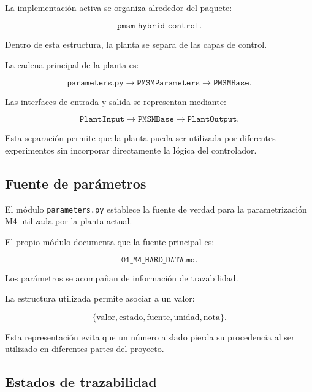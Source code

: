 La implementación activa se organiza alrededor del paquete:

\begin{equation}
\texttt{pmsm\_hybrid\_control}.
\end{equation}

Dentro de esta estructura, la planta se separa de las capas de control.

La cadena principal de la planta es:

\begin{equation}
\texttt{parameters.py}
\rightarrow
\texttt{PMSMParameters}
\rightarrow
\texttt{PMSMBase}.
\end{equation}

Las interfaces de entrada y salida se representan mediante:

\begin{equation}
\texttt{PlantInput}
\rightarrow
\texttt{PMSMBase}
\rightarrow
\texttt{PlantOutput}.
\end{equation}

Esta separación permite que la planta pueda ser utilizada por diferentes experimentos sin incorporar directamente la lógica del controlador.

\subsection{Fuente de parámetros}

El módulo \texttt{parameters.py} establece la fuente de verdad para la parametrización M4 utilizada por la planta actual.

El propio módulo documenta que la fuente principal es:

\begin{equation}
\texttt{01\_M4\_HARD\_DATA.md}.
\end{equation}

Los parámetros se acompañan de información de trazabilidad.

La estructura utilizada permite asociar a un valor:

\begin{equation}
\{
\text{valor},
\text{estado},
\text{fuente},
\text{unidad},
\text{nota}
\}.
\end{equation}

Esta representación evita que un número aislado pierda su procedencia al ser utilizado en diferentes partes del proyecto.

\subsection{Estados de trazabilidad}

